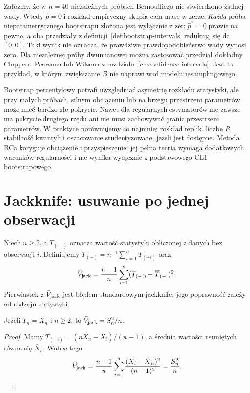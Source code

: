 \begin{przyklad}
\label{ex:bootstrap-zero}
Załóżmy, że w $n=40$ niezależnych próbach Bernoulliego
nie stwierdzono żadnej wady. Wtedy $\widehat p=0$
i rozkład empiryczny skupia całą masę w zerze.
\emph{Każda} próba nieparametrycznego bootstrapu złożona
jest wyłącznie z zer: $\widehat p^*=0$ prawie na pewno,
a oba przedziały z definicji~\ref{def:bootstrap-intervals}
redukują się do $[0,0]$. Taki wynik nie oznacza,
że prawdziwe prawdopodobieństwo wady wynosi zero.
Dla niezależnej próby dwumianowej można zastosować
przedział dokładny Cloppera--Pearsona lub Wilsona
z rozdziału~\ref{ch:confidence-intervals}.
Jest to przykład, w którym zwiększanie $B$ nie naprawi
wad modelu resamplingowego.
\end{przyklad}

\begin{uwaga}
Bootstrap percentylowy potrafi uwzględniać asymetrię rozkładu
statystyki, ale przy małych próbach, silnym obciążeniu lub na
brzegu przestrzeni parametrów może mieć bardzo złe pokrycie.
Nawet dla regularnych estymatorów nie zawsze ma pokrycie
drugiego rzędu ani nie musi zachowywać granic przestrzeni parametrów.
W praktyce porównujemy co najmniej rozkład replik, liczbę $B$,
stabilność kwantyli i oszacowanie studentyzowane, jeżeli jest dostępne.
Metoda BCa koryguje obciążenie i przyspieszenie; jej pełna teoria
wymaga dodatkowych warunków regularności i nie wynika wyłącznie
z podstawowego CLT bootstrapowego.
\end{uwaga}

\section{Jackknife: usuwanie po jednej obserwacji}
\begin{definicja}
\label{def:jackknife}
Niech $n\ge2$, a $T_{(-i)}$ oznacza wartość statystyki
obliczonej z danych bez obserwacji $i$.
Definiujemy $\overline T_{(-)}=n^{-1}\sum_{i=1}^nT_{(-i)}$
oraz
\[
 \widehat V_{\rm jack}=
 \frac{n-1}{n}\sum_{i=1}^n(T_{(-i)}-\overline T_{(-)})^2.
\]
Pierwiastek z $\widehat V_{\rm jack}$ jest błędem standardowym
jackknife; jego poprawność zależy od rodzaju statystyki.
\end{definicja}
\begin{stwierdzenie}
\label{prop:jackknife-mean}
Jeżeli $T_n=\overline X_n$ i $n\ge2$, to
$\widehat V_{\rm jack}=S_n^2/n$.
\end{stwierdzenie}
\begin{proof}
Mamy $T_{(-i)}=(n\overline X_n-X_i)/(n-1)$,
a średnia wartości usuniętych równa się $\overline X_n$.
Wobec tego
\[
 \widehat V_{\rm jack}=
 \frac{n-1}{n}\sum_{i=1}^n
 \frac{(X_i-\overline X_n)^2}{(n-1)^2}
 =\frac{S_n^2}{n}.
\]
\end{proof}

